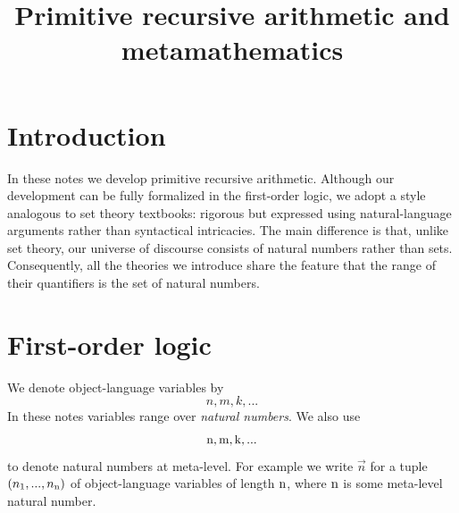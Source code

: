\documentclass[10pt]{amsart}
\begin{document}
\title{Primitive recursive arithmetic and metamathematics}
\maketitle{}

\section{Introduction}
\noindent
In these notes we develop primitive recursive arithmetic. Although our development can be fully formalized in the first-order logic, we adopt a style analogous to set theory textbooks: rigorous but expressed using natural-language arguments rather than syntactical intricacies. The main difference is that, unlike set theory, our universe of discourse consists of natural numbers rather than sets. Consequently, all the theories we introduce share the feature that the range of their quantifiers is the set of natural numbers. 

\section{First-order logic}
\noindent
We denote object-language variables by
$$n,m,k,...$$
In these notes variables range over \textit{natural numbers}. We also use
$$\rm{n},\rm{m},\rm{k},...$$
to denote natural numbers at meta-level. For example we write $\vec{n}$ for a tuple $(n_{\rm{1}},...,n_{\rm{n}})$ of object-language variables of length $\rm{n}$, where $\rm{n}$ is some meta-level natural number.
\end{document}
